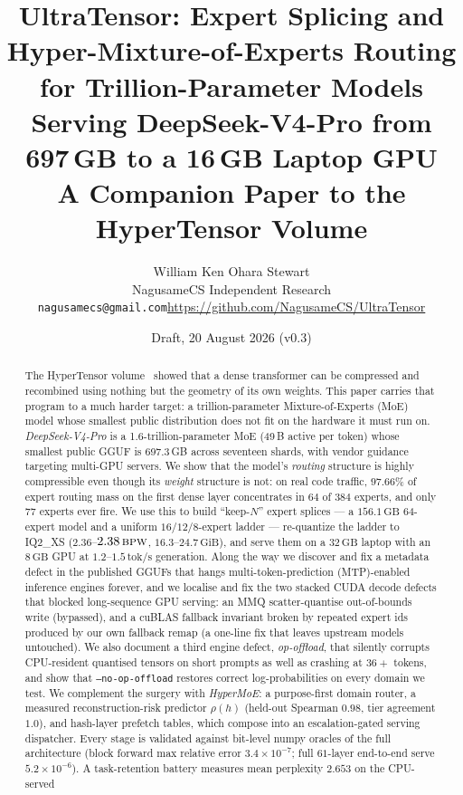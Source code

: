 \documentclass[11pt]{article}
\title{UltraTensor: Expert Splicing and Hyper-Mixture-of-Experts
Routing for Trillion-Parameter Models\\[4pt]
\large Serving DeepSeek-V4-Pro from 697\,GB to a 16\,GB Laptop GPU\\
\normalsize A Companion Paper to the HyperTensor Volume}
\author{William Ken Ohara Stewart\\
\small NagusameCS Independent Research\\
\small \texttt{nagusamecs@gmail.com}\quad\url{https://github.com/NagusameCS/UltraTensor}}
\date{Draft, 20 August 2026 (v0.3)}
\newcommand{\code}[1]{\texttt{#1}}
\newcommand{\bpw}{\,\textsc{bpw}}
\newcommand{\gib}{\,\textrm{GiB}}
\newcommand{\gb}{\,\textrm{GB}}
\newcommand{\tps}{\,\textrm{tok/s}}
\begin{document}
\maketitle

\begin{abstract}
\noindent
The HyperTensor volume~\cite{stewart2026hypertensor} showed that a dense
transformer can be compressed and recombined using nothing but the geometry
of its own weights. This paper carries that program to a much harder target:
a trillion-parameter Mixture-of-Experts (MoE) model whose smallest public
distribution does not fit on the hardware it must run on. \emph{DeepSeek-V4-Pro}
is a 1.6-trillion-parameter MoE (49\,B active per token) whose smallest public
GGUF is 697.3\gb{} across seventeen shards, with vendor guidance targeting
multi-GPU servers. We show that the model's \emph{routing} structure is highly
compressible even though its \emph{weight} structure is not: on real code
traffic, $97.66\%$ of expert routing mass on the first dense layer concentrates
in $64$ of $384$ experts, and only $77$ experts ever fire. We use this to build
``keep-$N$'' expert splices --- a $156.1\gb{}$ 64-expert model and a uniform
$16/12/8$-expert ladder --- re-quantize the ladder to IQ2\_XS
($2.36$--$2.38\bpw$, $16.3$--$24.7\gib{}$), and serve them on a $32\gb{}$ laptop
with an $8\gb{}$ GPU at $1.2$--$1.5\tps{}$ generation. Along the way we discover
and fix a metadata defect in the published GGUFs that hangs
multi-token-prediction (MTP)-enabled inference engines forever, and we localise
and fix the two stacked CUDA decode defects that blocked long-sequence GPU
serving: an MMQ scatter-quantise out-of-bounds write (bypassed), and a cuBLAS
fallback invariant broken by repeated expert ids produced by our own
fallback remap (a one-line fix that leaves upstream models untouched). We
also document a third engine defect, \emph{op-offload}, that silently corrupts
CPU-resident quantised tensors on short prompts as well as crashing at
$36{+}$ tokens, and show that \code{--no-op-offload} restores correct
log-probabilities on every domain we test. We
complement the
surgery with \emph{HyperMoE}: a purpose-first domain router, a measured
reconstruction-risk predictor $\rho(h)$ (held-out Spearman $0.98$, tier
agreement $1.0$), and hash-layer prefetch tables, which compose into an
escalation-gated serving dispatcher. Every stage is validated against bit-level
numpy oracles of the full architecture (block forward max relative error
$3.4\times10^{-7}$; full $61$-layer end-to-end serve $5.2\times10^{-6}$). A
task-retention battery measures mean perplexity $2.653$ on the CPU-served

\end{abstract}
\end{document}
